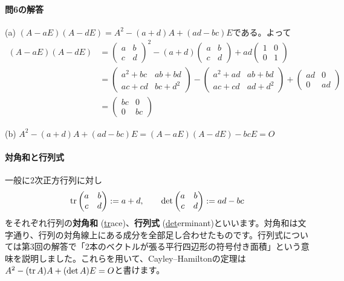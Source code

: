 \paragraph{問6の解答}
(a) $(A - aE)(A - dE) = A^2 - (a+d) A + (ad-bc) E$である。よって
\begin{align*}
(A - aE)(A - dE) &=
\begin{pmatrix}
a & b \\ 
c & d 
\end{pmatrix}^2
-
(a+d)
\begin{pmatrix}
a & b \\ 
c & d 
\end{pmatrix}
+
ad
\begin{pmatrix}
1 & 0 \\ 
0 & 1 
\end{pmatrix} \\
&=
\begin{pmatrix}
a^2 +bc & ab +bd \\ 
ac +cd & bc + d^2 
\end{pmatrix}
-
\begin{pmatrix}
a^2 + ad & ab +bd\\ 
ac + cd & ad + d^2
\end{pmatrix}
+
\begin{pmatrix}
ad & 0 \\ 
0 & ad
\end{pmatrix} \\
&=
\begin{pmatrix}
bc & 0\\ 
0 & bc
\end{pmatrix}
\end{align*}

(b) $A^2 - (a+d)A + (ad-bc) E = (A - aE)(A - dE) -bc E = O$

\paragraph{対角和と行列式} 一般に$2$次正方行列に対し
\[
\operatorname{tr}
\begin{pmatrix}
a & b \\
c  & d
\end{pmatrix}
:= a+d, \qquad
\det
\begin{pmatrix}
a & b \\
c  & d
\end{pmatrix}
:= ad - bc
\]
をそれぞれ行列の\textbf{対角和} (\underline{tr}ace)、\textbf{行列式} (\underline{det}erminant)といいます。対角和は文字通り、行列の対角線上にある成分を全部足し合わせたものです。行列式については第$3$回の解答で「$2$本のベクトルが張る平行四辺形の符号付き面積」という意味を説明しました。これらを用いて、Cayley--Hamiltonの定理は$A^2 - (\operatorname{tr} A) A + (\det A) E = O$と書けます。

